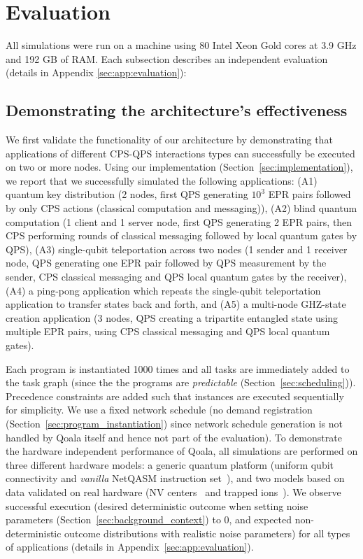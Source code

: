 \section{Evaluation}
\label{sec:evaluation}
All simulations were run on a machine using 80 Intel Xeon Gold cores at 3.9 GHz and 192 GB of RAM.
Each subsection describes an independent evaluation (details in Appendix \ref{sec:app:evaluation}):

\subsection{Demonstrating the architecture's effectiveness}
\label{sec:demonstrating_architecture_effectiveness}
We first validate the functionality of our architecture by demonstrating that applications of different CPS-QPS interactions types can successfully be executed on two or more nodes.
Using our implementation (Section~\ref{sec:implementation}), we report that we successfully simulated the following applications:
(A1) quantum key distribution (2 nodes, first QPS generating $10^3$ EPR pairs followed by only CPS actions (classical computation and messaging)),
(A2) blind quantum computation (1 client and 1 server node, first QPS generating 2 EPR pairs, then CPS performing rounds of classical messaging followed by local quantum gates by QPS),
(A3) single-qubit teleportation across two nodes (1 sender and 1 receiver node, QPS generating one EPR pair followed by QPS measurement by the sender, CPS classical messaging and QPS local quantum gates by the receiver),
(A4) a ping-pong application which repeats the single-qubit teleportation application to transfer states back and forth,
and (A5) a multi-node GHZ-state~\cite{greenberger1989going} creation application (3 nodes, QPS creating a tripartite entangled state using multiple EPR pairs, using CPS classical messaging and QPS local quantum gates).

Each program is instantiated 1000 times and all tasks are immediately added to the task graph (since the the programs are \textit{predictable} (Section~\ref{sec:scheduling})).
Precedence constraints are added such that instances are executed sequentially for simplicity.
We use a fixed network schedule (no demand registration (Section~\ref{sec:program_instantiation}) since network schedule generation is not handled by Qoala itself and hence not part of the evaluation).
To demonstrate the hardware independent performance of Qoala, all simulations are performed on three different hardware models: a generic quantum platform (uniform qubit connectivity and \textit{vanilla} NetQASM instruction set~\cite{dahlberg2022netqasm}),
and two models based on data validated on real hardware (NV centers~\cite{bradley2019ten, hermans2022qubit} and trapped ions~\cite{krutyanskiy2023entanglement}). 
We observe successful execution (desired deterministic outcome when setting noise parameters (Section~\ref{sec:background_context}) to 0, and expected non-deterministic outcome distributions with realistic noise parameters) for all types of applications (details in Appendix~\ref{sec:app:evaluation}).

